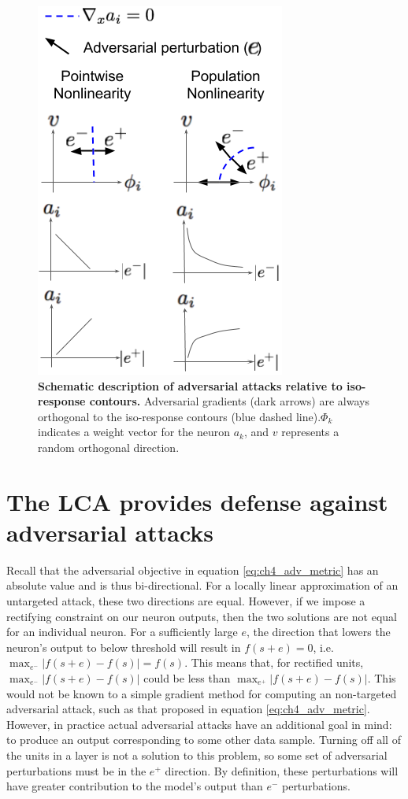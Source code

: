 \begin{figure}
    \centering
    \includegraphics[width=0.3\columnwidth]{figures/adversarial_gradients_iso_contours.png}
    \caption{\textbf{Schematic description of adversarial attacks relative to iso-response contours.} Adversarial gradients (dark arrows) are always orthogonal to the iso-response contours (blue dashed line).$\Phi_{k}$ indicates a weight vector for the neuron $a_{k}$, and $v$ represents a random orthogonal direction.}
    \label{fig:ch4_adv_grads}
\end{figure}

\section{The LCA provides defense against adversarial attacks}
Recall that the adversarial objective in equation \eqref{eq:ch4_adv_metric} has an absolute value and is thus bi-directional.
For a locally linear approximation of an untargeted attack, these two directions are equal.
However, if we impose a rectifying constraint on our neuron outputs, then the two solutions are not equal for an individual neuron.
For a sufficiently large $e$, the direction that lowers the neuron's output to below threshold will result in $f(s+e)=0$, i.e. $\max_{e^{-}}|f(s+e)-f(s)| = f(s)$.
This means that, for rectified units, $\max_{e^{-}}|f(s+e)-f(s)|$ could be less than $\max_{e^{+}}|f(s+e)-f(s)|$.
This would not be known to a simple gradient method for computing an non-targeted adversarial attack, such as that proposed in equation \eqref{eq:ch4_adv_metric}.
However, in practice actual adversarial attacks have an additional goal in mind: to produce an output corresponding to some other data sample.
Turning off all of the units in a layer is not a solution to this problem, so some set of adversarial perturbations must be in the $e^{+}$ direction.
By definition, these perturbations will have greater contribution to the model's output than $e^{-}$ perturbations.

